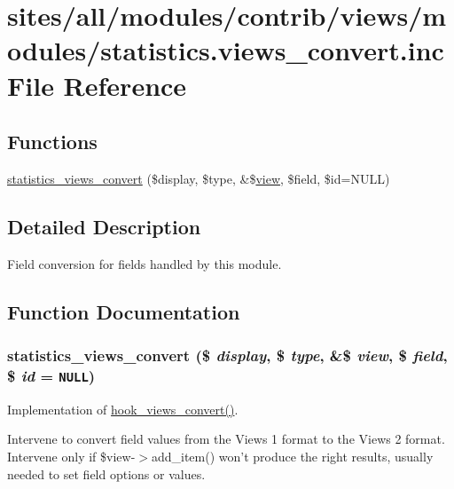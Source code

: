 \hypertarget{statistics_8views__convert_8inc}{
\section{sites/all/modules/contrib/views/modules/statistics.views\_\-convert.inc File Reference}
\label{statistics_8views__convert_8inc}
}
\subsection*{Functions}
\begin{CompactItemize}
\item 
\hyperlink{statistics_8views__convert_8inc_0cbb2de42debb7e42b6394ee39e10dd2}{statistics\_\-views\_\-convert} (\$display, \$type, \&\$\hyperlink{classview}{view}, \$field, \$id=NULL)
\end{CompactItemize}


\subsection{Detailed Description}
Field conversion for fields handled by this module. 

\subsection{Function Documentation}
\hypertarget{statistics_8views__convert_8inc_0cbb2de42debb7e42b6394ee39e10dd2}{
\subsubsection[{statistics\_\-views\_\-convert}]{\setlength{\rightskip}{0pt plus 5cm}statistics\_\-views\_\-convert (\$ {\em display}, \/  \$ {\em type}, \/  \&\$ {\em view}, \/  \$ {\em field}, \/  \$ {\em id} = {\tt NULL})}}
\label{statistics_8views__convert_8inc_0cbb2de42debb7e42b6394ee39e10dd2}


Implementation of \hyperlink{group__views__hooks_ge98b0a1c700fe1406af390dfc8c7262e}{hook\_\-views\_\-convert()}.

Intervene to convert field values from the Views 1 format to the Views 2 format. Intervene only if \$view-$>$add\_\-item() won't produce the right results, usually needed to set field options or values. 